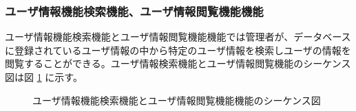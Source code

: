 \documentclass[a4j]{jarticle}
\begin{document}
 \subsubsection{ユーザ情報機能検索機能、ユーザ情報閲覧機能機能}
 ユーザ情報機能検索機能とユーザ情報閲覧機能機能では管理者が、データベースに登録されているユーザ情報の中から特定のユーザ情報を検索しユーザの情報を閲覧することができる。ユーザ情報検索機能とユーザ情報閲覧機能のシーケンス図は図 \ref{fig:admin_user_reading-search.png} に示す。
               \begin{figure}[H]
\centering
{}
\caption{ユーザ情報機能検索機能とユーザ情報閲覧機能機能のシーケンス図}
\label{fig:admin_user_reading-search.png}
\end{figure}
\end{document}
